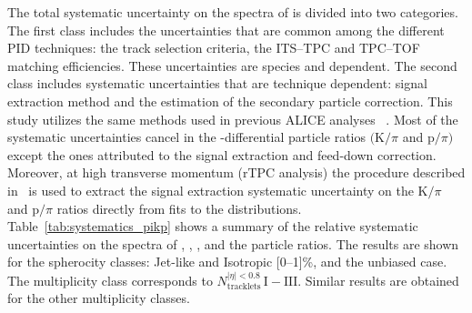 The total systematic uncertainty on the \pt spectra of \pikp is divided into two categories. The first class includes the uncertainties  that are common among the different PID techniques: the track selection criteria, the ITS--TPC and TPC--TOF matching efficiencies. These uncertainties are species and \pt dependent. The second class includes systematic uncertainties that are technique dependent: signal extraction method and the estimation of the secondary particle correction. This study utilizes the same methods used in previous ALICE analyses ~\cite{ALICE:2023yuk,ALICE:2020nkc,ALICE:2019hno,pikp_rtpc}. Most of the systematic uncertainties cancel in the \pt-differential particle ratios $(\mathrm{K}/\pi$ and $\mathrm{p}/\pi)$ except the ones attributed to the signal extraction and feed-down correction. Moreover, at high transverse momentum (rTPC analysis) the procedure described in~\cite{pikp_rtpc} is used to extract the signal extraction systematic uncertainty on the $\mathrm{K}/\pi$ and $\mathrm{p}/\pi$ ratios directly from fits to the \dedx distributions. Table~\ref{tab:systematics_pikp} shows a summary of the relative systematic uncertainties on the \pt spectra of \pion, \kaon, \pr, and the particle ratios. The results are shown for the spherocity classes: Jet-like and Isotropic [0--1]\%, and the \SOPT unbiased case. The multiplicity class corresponds to $N_{\mathrm{tracklets}}^{|\eta|<0.8}\, \mathrm{I{-}III}$. Similar results are obtained for the other multiplicity classes. 
\iffalse
